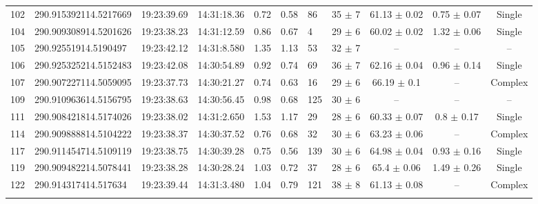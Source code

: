 \begin{table}[htbp!]
\begin{tabular}{llllllllccc}
102  &  290.915392114.5217669  &  19:23:39.69  &  14:31:18.36  &  0.72  &  0.58  &  86  &  35 $\pm$ 7  &  61.13 $\pm$ 0.02  &  0.75 $\pm$ 0.07  &  Single \\
104  &  290.909308914.5201626  &  19:23:38.23  &  14:31:12.59  &  0.86  &  0.67  &  4  &  29 $\pm$ 6  &  60.02 $\pm$ 0.02  &  1.32 $\pm$ 0.06  &  Single \\
105  &  290.92551914.5190497  &  19:23:42.12  &  14:31:8.580  &  1.35  &  1.13  &  53  &  32 $\pm$ 7  &  --  &  --  &  -- \\
106  &  290.925325214.5152483  &  19:23:42.08  &  14:30:54.89  &  0.92  &  0.74  &  69  &  36 $\pm$ 7  &  62.16 $\pm$ 0.04  &  0.96 $\pm$ 0.14  &  Single \\
107  &  290.907227114.5059095  &  19:23:37.73  &  14:30:21.27  &  0.74  &  0.63  &  16  &  29 $\pm$ 6  &  66.19 $\pm$ 0.1  &  --  &  Complex \\
109  &  290.910963614.5156795  &  19:23:38.63  &  14:30:56.45  &  0.98  &  0.68  &  125  &  30 $\pm$ 6  &  --  &  --  &  -- \\
111  &  290.908421814.5174026  &  19:23:38.02  &  14:31:2.650  &  1.53  &  1.17  &  29  &  28 $\pm$ 6  &  60.33 $\pm$ 0.07  &  0.8 $\pm$ 0.17  &  Single \\
114  &  290.909888814.5104222  &  19:23:38.37  &  14:30:37.52  &  0.76  &  0.68  &  32  &  30 $\pm$ 6  &  63.23 $\pm$ 0.06  &  --  &  Complex \\
117  &  290.911454714.5109119  &  19:23:38.75  &  14:30:39.28  &  0.75  &  0.56  &  139  &  30 $\pm$ 6  &  64.98 $\pm$ 0.04  &  0.93 $\pm$ 0.16  &  Single \\
119  &  290.909482214.5078441  &  19:23:38.28  &  14:30:28.24  &  1.03  &  0.72  &  37  &  28 $\pm$ 6  &  65.4 $\pm$ 0.06  &  1.49 $\pm$ 0.26  &  Single \\
122  &  290.914317414.517634  &  19:23:39.44  &  14:31:3.480  &  1.04  &  0.79  &  121  &  38 $\pm$ 8  &  61.13 $\pm$ 0.08  &  --  &  Complex \\
\hline \noalign {\smallskip}
\end{tabular}
\end{table}

